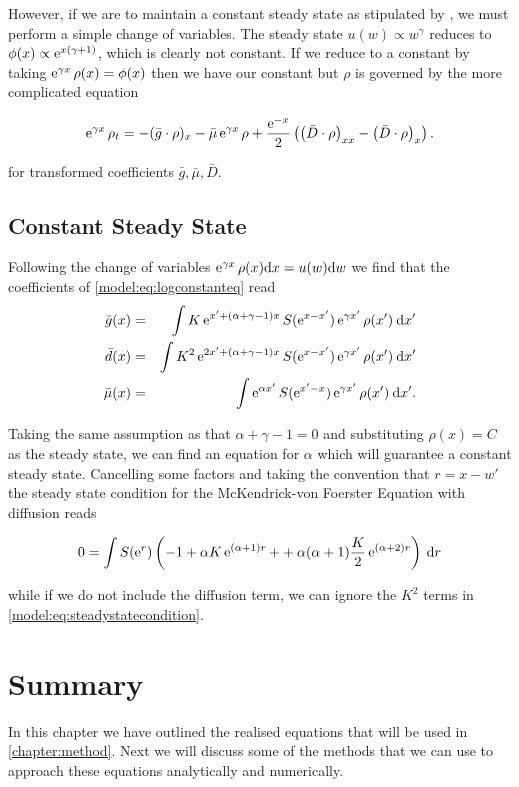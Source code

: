 \documentclass[../main]{subfiles}
\begin{document}
  However, if we are to maintain a constant steady state as stipulated by \cite{sheldon1967}, we must perform a simple change of variables. The steady state $u(w) \propto w^{\gamma}$ reduces to $\phi(x) \propto \operatorname{e}^{x(\gamma +1)}$, which is clearly not constant. If we reduce to a constant by taking $\operatorname{e}^{\gamma x} \rho(x) = \phi(x)$ then we have our constant but $\rho$ is governed by the more complicated equation

  \begin{equation} \label{model:eq:logconstanteq}
    \operatorname{e}^{\gamma x} \rho_t = - (\bar{g} \cdot \rho)_x - \bar{\mu} \operatorname{e}^{\gamma x} \rho + \frac{\operatorname{e}^{-x}}{2} \left( \left( \bar{D} \cdot \rho \right)_{xx} - \left( \bar{D} \cdot \rho \right)_x \right).
  \end{equation}

  for transformed coefficients $\bar{g}, \bar{\mu}, \bar{D}$.

  \subsection{Constant Steady State}
  Following the change of variables $\operatorname{e}^{\gamma x} \rho(x) \mathrm{d}x = u(w) \mathrm{d}w$ we find that the coefficients of \autoref{model:eq:logconstanteq} read
  \begin{eqnarray}
    \bar{g}(x)  &=& \int K \operatorname{e}^{x' + (\alpha + \gamma - 1) x} S(\operatorname{e}^{x - x'}) \operatorname{e}^{\gamma x'} \rho(x') \: \mathrm{d}x' \\
    \bar{d}(x)  &=& \int K^2 \operatorname{e}^{2x' + (\alpha + \gamma - 1) x} S(\operatorname{e}^{x - x'}) \operatorname{e}^{\gamma x'} \rho(x') \: \mathrm{d}x' \\
    \bar{\mu}(x) &=& \int \operatorname{e}^{\alpha x'} S(\operatorname{e}^{x' - x}) \operatorname{e}^{\gamma x'} \rho(x') \: \mathrm{d}x'.
  \end{eqnarray}

  Taking the same assumption as \cite{datta2011} that $\alpha + \gamma - 1 = 0$ and substituting $\rho(x) = C$ as the steady state, we can find an equation for $\alpha$ which will guarantee a constant steady state. Cancelling some factors and taking the convention that $r = x - w'$ the steady state condition for the McKendrick-von Foerster Equation with diffusion reads

  \begin{equation} \label{model:eq:steadystatecondition}
    0 = \int S(\operatorname{e}^{r}) \left(-1 + \alpha K \operatorname{e}^{(\alpha + 1)r} + + \alpha (\alpha + 1) \frac{K}{2} \operatorname{e}^{(\alpha + 2)r} \right) \: \mathrm{d}r
  \end{equation}

  while if we do not include the diffusion term, we can ignore the $K^2$ terms in \autoref{model:eq:steadystatecondition}.

  \section{Summary}
  In this chapter we have outlined the realised equations that will be used in \autoref{chapter:method}. Next we will discuss some of the methods that we can use to approach these equations analytically and numerically.
\end{document}
